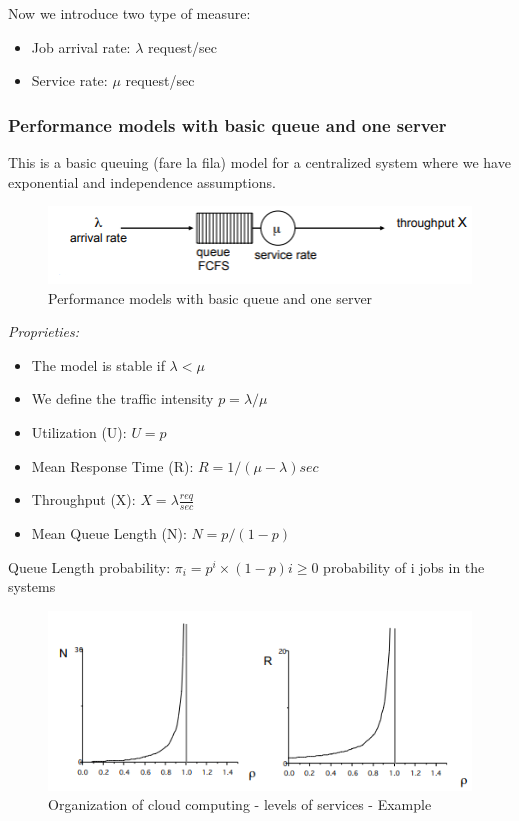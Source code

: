 Now we introduce two type of measure:
\begin{itemize}
    \item Job arrival rate: 		$\lambda$ 	request/sec
    \item Service rate: 		    $\mu$ 	request/sec
\end{itemize}

\subsubsection{Performance models with basic queue and one server}
This is a basic queuing (fare la fila) model for a centralized system where we have exponential and independence assumptions.
\begin{figure}[!h]
            \centering
            \includegraphics[width=.7\linewidth]{images/modelOfSystems/PerformanceModelsWithBasicQueueAndOneServer.png}
            \caption{Performance models with basic queue and one server
}
    \end{figure}
\textit{Proprieties:}
\begin{itemize}
    \item The model is stable if \(\lambda < \mu\)
    \item We define the traffic intensity \(p = \lambda / \mu\)
    \item Utilization (U): 			\(U = p\)
    \item Mean Response Time (R):	\(R = 1 / (\mu - \lambda) sec\)
    \item Throughput (X):		    \(X = \lambda \frac{req}{sec}\)
    \item Mean Queue Length (N):	\(N =  p / (1 - p)\)
\end{itemize}
Queue Length probability: \(\pi_i = p^i\times (1 - p)    i \geq 0\) probability of i jobs in the systems
\begin{figure}[!h]
            \centering
            \includegraphics[width=.7\linewidth]{images/modelOfSystems/meanJob.png}
            \caption{Organization of cloud computing - levels of services - Example
}
    \end{figure}




